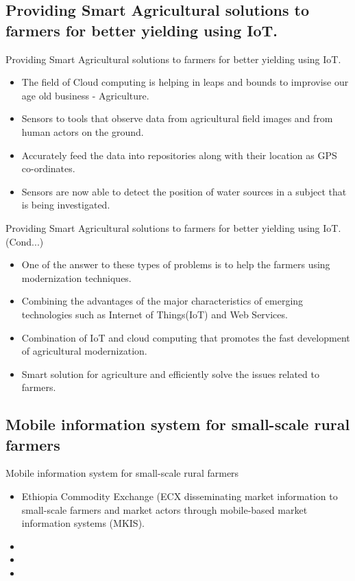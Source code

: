   \subsection{Providing Smart Agricultural solutions to farmers for better yielding using IoT.}
  \begin{frame}{Providing Smart Agricultural solutions to farmers for better yielding using IoT.}
  \begin{itemize}
  \item The field of Cloud computing is helping in leaps and bounds to improvise our age old business - Agriculture.
  \item Sensors to tools that observe data from agricultural field images and from human actors on the ground.
\item Accurately feed the data into repositories along with their location as GPS co-ordinates.
\item Sensors are now able to detect the position of water sources in a subject that is being investigated.
\end{itemize}
 \end{frame}
\begin{frame}{Providing Smart Agricultural solutions to farmers for better yielding using IoT.(Cond...)}
  \begin{itemize}
\item  One of the answer to these types of problems is to help the farmers using modernization techniques.
\item Combining the advantages of the major characteristics of emerging technologies such as Internet of Things(IoT) and Web Services. 
\item Combination of IoT and cloud computing that promotes the fast development of agricultural modernization.
\item Smart solution for agriculture and efficiently solve the issues related to farmers.
  \end{itemize}
  \end{frame}
  
  \subsection{Mobile information system for small-scale rural farmers}
  \begin{frame}{Mobile information system for small-scale rural farmers}
  \begin{itemize}
  \item Ethiopia Commodity Exchange (ECX disseminating market information to small-scale farmers and market actors through mobile-based market information systems (MKIS). 
  \item 
\item 
\item 
\end{itemize}
 \end{frame}
 
